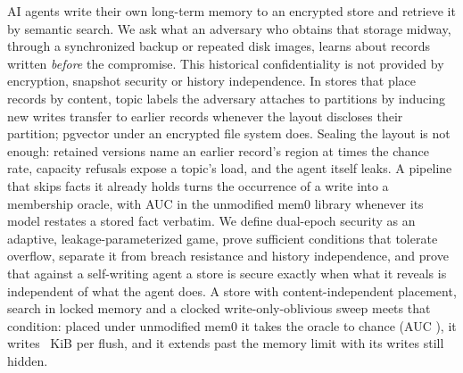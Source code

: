 AI agents write their own long-term memory to an encrypted store and retrieve it by semantic
search. We ask what an adversary who obtains that storage midway, through a synchronized backup or
repeated disk images, learns about records written \emph{before} the compromise. This historical
confidentiality is not provided by encryption, snapshot security or history independence. In stores
that place records by content, topic labels the adversary attaches to partitions by inducing new
writes transfer to earlier records whenever the layout discloses their partition; pgvector under an
encrypted file system does. Sealing the layout is not enough: retained versions name an earlier
record's region at \REnineteenPrecRatio{} times the chance rate, capacity refusals expose a topic's
load, and the agent itself leaks. A pipeline that skips facts it already holds turns the occurrence
of a write into a membership oracle, with AUC \REtwentynineQdrantPt{} in the unmodified mem0 library
whenever its model restates a stored fact verbatim. We define dual-epoch security as an adaptive,
leakage-parameterized game, prove sufficient conditions that tolerate overflow, separate it from
breach resistance and history independence, and prove that against a self-writing agent a store is
secure exactly when what it reveals is independent of what the agent does. A store with
content-independent placement, search in locked memory and a clocked write-only-oblivious sweep meets
that condition: placed under unmodified mem0 it takes the oracle to chance (AUC
\REtwentynineMStorePt), it writes \REtwentyoneSweepKiB~KiB per flush, and it extends past the memory
limit with its writes still hidden.
